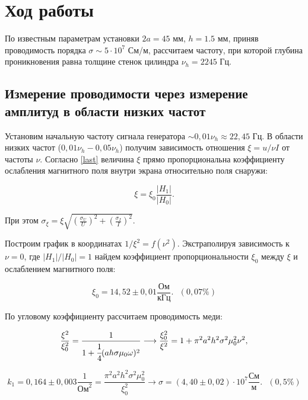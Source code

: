 \documentclass[a4paper,12pt]{article}
\theoremstyle{plain} %
\theoremstyle{definition} %
\theoremstyle{remark} %
\begin{document}
	\section{Ход работы}
	
	По известным параметрам установки $2a = 45$ мм, $h=1.5$ мм, приняв проводимость порядка
	$\sigma \sim 5\cdot 10^7$ См/м, рассчитаем частоту, при которой
	глубина проникновения равна толщине стенок цилиндра $\nu_h = 2245$ Гц.
	
	\subsection{Измерение проводимости через измерение амплитуд в области низких частот}
	
Установим начальную частоту сигнала генератора $\sim 0,01 \nu_h \approx 22,45$ Гц. В области низких частот ($0,01 \nu_h - 0,05 \nu_h$) получим зависимость отношения $\xi = u/\nu I$ от частоты $\nu$. Согласно \eqref{last} величина $\xi$ прямо пропорциональна коэффициенту ослабления магнитного поля внутри экрана относительно поля снаружи:

\begin{equation*}
	\xi = \xi_0 \frac{|H_1|}{|H_0|}.
\end{equation*}
	
	При этом $\sigma_{\xi} = \xi \sqrt{\left(\frac{\sigma_U}{U}\right)^2 + \left(\frac{\sigma_I}{I}\right)^2}$.
	
	Построим график в координатах $1/\xi^2 = f(\nu^2)$. Экстраполируя зависимость к $\nu = 0$, где $|H_1|/|H_0| = 1$ найдем коэффициент пропорциональности $\xi_0$ между $\xi$ и ослаблением магнитного поля:
	
		\begin{equation}
		\xi_0 = 14,52 \pm 0,01 \frac{\text{Ом}}{\text{кГц}}. \ \ \ (0,07 \%)
	\end{equation}
	
		
	По угловому коэффициенту рассчитаем проводимость меди:
	
	\begin{equation*}
		\frac{\xi^2}{\xi_0^2} = \frac{1}{1 + \cfrac{1}{4}(ah\sigma \mu_0 \omega)^2} \longrightarrow \frac{\xi^2_0}{\xi^2} = 1 + \pi^2 a^2 h^2 \sigma^2 \mu_0^2 \nu^2,
	\end{equation*}
	
	\begin{equation}
		k _1 = 0,164 \pm 0,003 \frac{1}{\text{Ом}^2} = \frac{\pi^2 a^2 h^2 \sigma^2 \mu_0^2}{\xi_0^2} \longrightarrow \sigma = (4,40 \pm 0,02) \cdot 10^7 \frac{\text{См}}{\text{м}}. \ \ \  (0,5\%)
	\end{equation}
	
\end{document}
